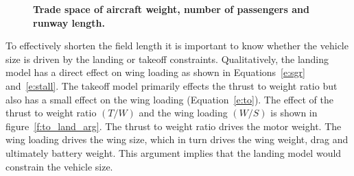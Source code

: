\documentclass[]{aiaa-tc}%
\begin{document}
\begin{figure}[h!]
 \begin{subfigmatrix}{2}%
 \end{subfigmatrix}
    \caption{\textbf{Trade space of aircraft weight, number of passengers and runway length.}}
 \label{f:sw_mt}
\end{figure}

To effectively shorten the field length it is important to know whether the vehicle size is driven by the landing or takeoff constraints. 
Qualitatively, the landing model has a direct effect on wing loading as shown in Equations~\ref{e:sgr} and~\ref{e:stall}.  
The takeoff model primarily effects the thrust to weight ratio but also has a small effect on the wing loading (Equation~\ref{e:to}). 
The effect of the thrust to weight ratio $(T/W)$ and the wing loading $(W/S)$ is shown in figure~\ref{f:to_land_arg}.
The thrust to weight ratio drives the motor weight.  
The wing loading drives the wing size, which in turn drives the wing weight, drag and ultimately battery weight.  
This argument implies that the landing model would constrain the vehicle size. 
\end{document}

